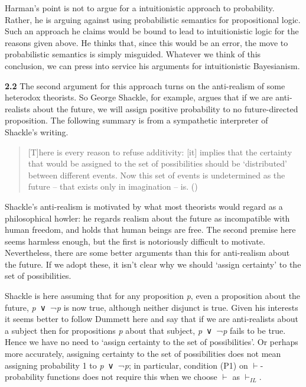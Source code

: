 \documentclass[
  10pt,
  letterpaper,
  DIV=11,
  numbers=noendperiod,
  twoside]{scrartcl}
\begin{document}
Harman's point is not to argue for a intuitionistic approach to
probability. Rather, he is arguing against using probabilistic semantics
for propositional logic. Such an approach he claims would be bound to
lead to intuitionistic logic for the reasons given above. He thinks
that, since this would be an error, the move to probabilistic semantics
is simply misguided. Whatever we think of this conclusion, we can press
into service his arguments for intuitionistic Bayesianism.

\textbf{2.2} The second argument for this approach turns on the
anti-realism of some heterodox theorists. So George Shackle, for
example, argues that if we are anti-realists about the future, we will
assign positive probability to no future-directed proposition. The
following summary is from a sympathetic interpreter of Shackle's
writing.

\begin{quote}
{[}T{]}here is every reason to refuse additivity: {[}it{]} implies that
the certainty that would be assigned to the set of possibilities should
be `distributed' between different events. Now this set of events is
undetermined as the future -- that exists only in imagination -- is.
()
\end{quote}

Shackle's anti-realism is motivated by what most theorists would regard
as a philosophical howler: he regards realism about the future as
incompatible with human freedom, and holds that human beings are free.
The second premise here seems harmless enough, but the first is
notoriously difficult to motivate. Nevertheless, there are some better
arguments than this for anti-realism about the future. If we adopt
these, it isn't clear why we should `assign certainty' to the set of
possibilities.

Shackle is here assuming that for any proposition \emph{p}, even a
proposition about the future, \emph{p}~∨~¬\emph{p} is now true, although
neither disjunct is true. Given his interests it seems better to follow
Dummett here and say that if we are anti-realists about a subject then
for propositions \emph{p} about that subject, \emph{p}~∨~¬\emph{p} fails
to be true. Hence we have no need to `assign certainty to the set of
possibilities'. Or perhaps more accurately, assigning certainty to the
set of possibilities does not mean assigning probability 1 to
\emph{p}~∨~¬\emph{p}; in particular, condition (P1) on
\(\vdash\)-probability functions does not require this when we choose
\(\vdash\) as \(\vdash_{IL}\).
\end{document}
